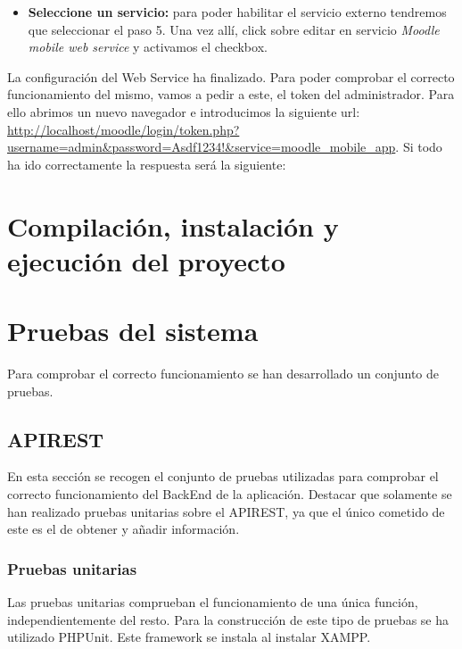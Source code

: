 \begin{itemize}
\begin{itemize}
		\item \textbf{Seleccione un servicio:} para poder habilitar el servicio externo tendremos que seleccionar el paso 5. Una vez allí, click sobre editar en servicio \emph{Moodle mobile web service} y activamos el checkbox.
		
	
	\end{itemize}
	
La configuración del Web Service ha finalizado. Para poder comprobar el correcto funcionamiento del mismo, vamos a pedir a este, el token del administrador. Para ello abrimos un nuevo navegador e introducimos la siguiente url: \url{http://localhost/moodle/login/token.php?username=admin&password=Asdf1234!&service=moodle_mobile_app}. Si todo ha ido correctamente la respuesta será la siguiente:
	
	

\end{itemize}


\section{Compilación, instalación y ejecución del proyecto}

\section{Pruebas del sistema}

Para comprobar el correcto funcionamiento se han desarrollado un conjunto de pruebas.

\subsection{APIREST}
En esta sección se recogen el conjunto de pruebas utilizadas para comprobar el correcto funcionamiento del BackEnd de la aplicación. Destacar que solamente se han realizado pruebas unitarias sobre el APIREST, ya que el único cometido de este es el de obtener y añadir información.

\subsubsection{Pruebas unitarias}

Las pruebas unitarias comprueban el funcionamiento de una única función, independientemente del resto. Para la construcción de este tipo de pruebas se ha utilizado PHPUnit. Este framework se instala al instalar XAMPP.

